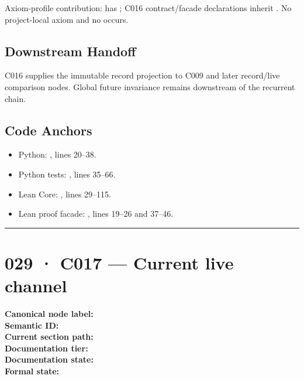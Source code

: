 Axiom-profile contribution:
\texttt{\protect{}} has
\texttt{\protect{}}; C016 contract/facade declarations
inherit \texttt{\protect{}}. No
project-local axiom and no \texttt{\protect{}} occurs.

\subsection{Downstream Handoff}\label{downstream-handoff-27}

C016 supplies the immutable record projection to C009 and later
record/live comparison nodes. Global future invariance remains
downstream of the recurrent chain.

\subsection{Code Anchors}\label{code-anchors-17}

\begin{itemize}
\tightlist
\item
  Python:
  \texttt{\protect{}},
  lines 20--38.
\item
  Python tests:
  \texttt{\protect{}}, lines
  35--66.
\item
  Lean Core: \texttt{\protect{}}, lines
  29--115.
\item
  Lean proof facade:
  \texttt{\protect{}}, lines
  19--26 and 37--46.
\end{itemize}

\begin{center}\rule{0.5\linewidth}{0.5pt}\end{center}

\section{029 · C017 --- Current live
channel}\label{c017-current-live-channel}

\textbf{Canonical node label:} \texttt{\protect{}}\\
\textbf{Semantic ID:} \texttt{\protect{}}\\
\textbf{Current section path:} \texttt{\protect{}}\\
\textbf{Documentation tier:} \texttt{\protect{}}\\
\textbf{Documentation state:} \texttt{\protect{}}\\
\textbf{Formal state:}
\texttt{\protect{}}

